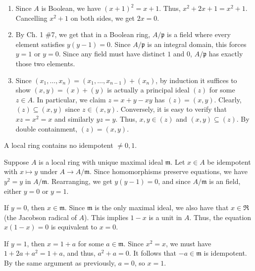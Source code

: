\documentclass[12 pt, letterpaper]{hmcpset}
\begin{document}
\begin{solution}
	\begin{enumerate}
		\item Since $A$ is Boolean, we have $(x + 1)^{2} = x + 1$. Thus, $x^{2} + 2x + 1 = x^{2} + 1$. Cancelling $x^{2} + 1$ on both sides, we get $2x = 0$.

		\item By Ch. 1 \#7, we get that in a Boolean ring, $A / \mathfrak{p}$ is a field where every element satisfies $y(y - 1) = 0$. Since $A / \mathfrak{p}$ is an integral domain, this forces $y = 1$ or $y = 0$. Since any field must have distinct $1$ and $0$, $A / \mathfrak{p}$ has exactly those two elements.

		\item Since $(x_{1}, \dots, x_{n}) = (x_{1}, \dots, x_{n - 1}) + (x_{n})$, by induction it suffices to show $(x, y) = (x) + (y)$ is actually a principal ideal $(z)$ for some $z \in A$. In particular, we claim $z = x + y - xy$ has $(z) = (x, y)$. Clearly, $(z) \subseteq (x, y)$ since $z \in (x, y)$. Conversely, it is easy to verify that $xz = x^{2} = x$ and similarly $yz = y$. Thus, $x, y \in (z)$ and $(x, y) \subseteq (z)$. By double containment, $(z) = (x, y)$.
	\end{enumerate}
\end{solution}

\pagebreak

\begin{problem}[A \& M Ch. 1 \#12.]
	A local ring contains no idempotent $\neq 0, 1$.
\end{problem}

\begin{solution}
	Suppose $A$ is a local ring with unique maximal ideal $\mathfrak{m}$. Let $x \in A$ be idempotent with $x \mapsto y$ under $A \to A / \mathfrak{m}$. Since homomorphisms preserve equations, we have $y^{2} = y$ in $A / \mathfrak{m}$. Rearranging, we get $y (y - 1) = 0$, and since $A / \mathfrak{m}$ is an field, either $y = 0$ or $y = 1$.

	If $y = 0$, then $x \in \mathfrak{m}$. Since $\mathfrak{m}$ is the only maximal ideal, we also have that $x \in \mathfrak{R}$ (the Jacobson radical of $A$). This implies $1 - x$ is a unit in $A$. Thus, the equation $x(1 - x) = 0$ is equivalent to $x = 0$.

	If $y = 1$, then $x = 1 + a$ for some $a \in \mathfrak{m}$. Since $x^{2} = x$, we must have  $1 + 2a + a^{2} = 1 + a$, and thus, $a^{2} + a = 0$. It follows that $-a \in \mathfrak{m}$ is idempotent. By the same argument as previously, $a = 0$, so $x = 1$.
\end{solution}
\end{document}
